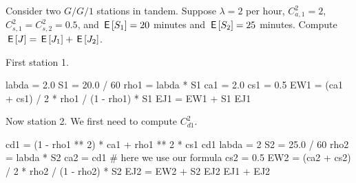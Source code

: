 \documentclass[queueing-book.tex]{subfiles}
\begin{document}
\begin{exercise}\label{ex:l-127}
Consider two $G/G/1$ stations in tandem.
Suppose $\lambda=2$ per hour, $C_{a,1}^2=2$, $C_{s,1}^2=C_{s,2}^2 = 0.5$, and $\,\mathsf{E}\left[S_1\right]=20$ minutes and $\,\mathsf{E}\left[S_2\right]=25$ minutes.
Compute $\,\mathsf{E}\left[J\right] = \,\mathsf{E}\left[J_1\right]+ \,\mathsf{E}\left[J_2\right]$.
\begin{solution}
First station 1.
\begin{pyconsole}
labda = 2.0
S1 = 20.0 / 60
rho1 = labda * S1
ca1 = 2.0
cs1 = 0.5
EW1 = (ca1 + cs1) / 2 * rho1 / (1 - rho1) * S1
EJ1 = EW1 + S1
EJ1
\end{pyconsole}

Now station 2. We first need to compute $C_{d1}^2$.

\begin{pyconsole}
cd1 = (1 - rho1 ** 2) * ca1 + rho1 ** 2 * cs1
cd1
labda = 2
S2 = 25.0 / 60
rho2 = labda * S2
ca2 = cd1  # here we use our formula
cs2 = 0.5
EW2 = (ca2 + cs2) / 2 * rho2 / (1 - rho2) * S2
EJ2 = EW2 + S2
EJ2
EJ1 + EJ2
\end{pyconsole}

\end{solution}
\end{exercise}



\end{document}
